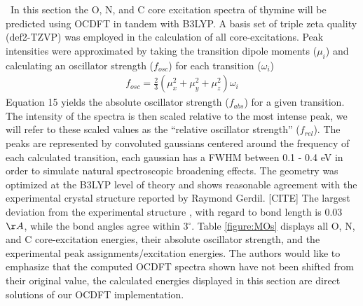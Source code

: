 \documentclass[11.5pt]{article}
\begin{document}
  \ In this section the O, N, and C core excitation spectra of thymine will be predicted using OCDFT in tandem with B3LYP.  A basis set of triple zeta quality (def2-TZVP) was employed in the calculation of all core-excitations. Peak intensities were approximated by taking the transition dipole moments ($\mu_i$) and calculating an oscillator strength ($f_{osc} $) for each transition ($\omega_{i}$)
  \begin{align}
  f_{osc} = \frac{2}{3} (\mu_x^2 + \mu_y^2 + \mu_z^2) \omega_{i}
  \end{align}
Equation 15 yields the absolute oscillator strength ($f_{abs}$) for a given transition. The intensity of the spectra is then scaled relative to the most intense peak, we will refer to these scaled values as the ``relative oscillator strength'' ($f_{rel}$). The peaks are represented by convoluted gaussians centered around the frequency of each calculated transition, each gaussian has a FWHM between 0.1 - 0.4 eV in order to simulate natural spectroscopic broadening effects.  The geometry was optimized at the B3LYP level of theory and shows reasonable agreement with the experimental crystal structure reported by Raymond Gerdil. [CITE] The largest deviation from the experimental structure , with regard to bond length is 0.03 $\AA$, while the bond angles agree within 3$^{\circ}$. Table \ref{figure:MOs} displays all O, N, and C core-excitation energies, their absolute oscillator strength, and the experimental peak assignments/excitation energies. The authors would like to emphasize that the computed OCDFT spectra shown have not been shifted from their original value, the calculated energies displayed in this section are direct solutions of our OCDFT implementation. \\
\end{document}
